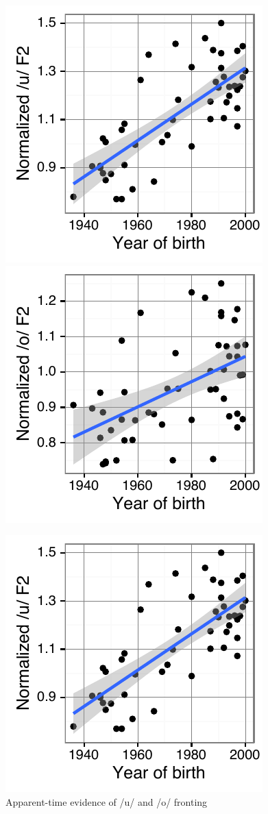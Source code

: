 \documentclass[PWPL]{article}
\begin{document}
\begin{figure}[H]
\centering
\includegraphics[scale=0.7]{uw_yob_small.pdf}
\includegraphics[scale=0.7]{ow_yob_small.pdf}
\caption{Apparent-time evidence of /u/ and /o/ fronting}
\includegraphics[scale=0.7]{uw_yob_small.pdf}

\end{figure}
\end{document}
